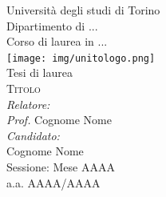 
\begin{titlepage}
\begin{center}

{\LARGE Università degli studi di Torino}\\
{Dipartimento di ...}\\[1cm]

{\Large Corso di laurea in ...}\\[0.5cm]
\texttt{[image: img/unitologo.png]}~\\[0.5cm]

{Tesi di laurea}\\[1cm]
\textsc{\LARGE Titolo}\\[1.5cm]


{\emph{Relatore:}}\\
{\emph{Prof.} Cognome Nome}\\[1cm]

{\emph{Candidato:}}\\
{Cognome Nome}\\[1.5cm]
{\Large Sessione: Mese AAAA}\\
{a.a. AAAA/AAAA}




\vfill

\end{center}
\end{titlepage}

